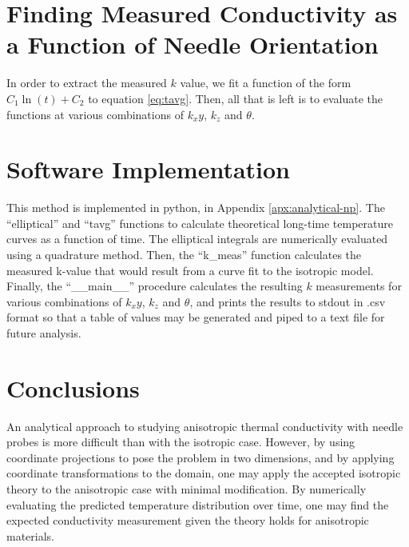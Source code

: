 \section{Finding Measured Conductivity as a Function of Needle Orientation}

In order to extract the measured \(k\) value, we fit a function of the form
\(C_1 \ln(t) + C_2\) to equation \ref{eq:tavg}. Then, all that is left is to evaluate the functions at various combinations of
\(k_xy\), \(k_z\) and \(\theta\).

\section{Software Implementation}

This method is implemented in python, in Appendix \ref{apx:analytical-np}. The ``elliptical'' and ``tavg'' functions to calculate theoretical long-time temperature curves as a function of time. The elliptical integrals are numerically evaluated using a quadrature method.  Then, the ``k\_meas'' function calculates the measured k-value that would result from a curve fit to the isotropic model. Finally, the ``\_\_main\_\_'' procedure calculates the resulting \(k\) measurements for various combinations of \(k_xy\), \(k_z\) and \(\theta\), and prints the results to stdout in .csv format so that a table of values may be generated and piped to a text file for future analysis.


\section{Conclusions}
\label{sec:analytical-np:conclusion}

An analytical approach to studying anisotropic thermal conductivity with needle
probes is more difficult than with the isotropic case. However, by using
coordinate projections to pose the problem in two dimensions, and by applying
coordinate transformations to the domain, one may apply the accepted isotropic
theory to the anisotropic case with minimal modification.  By numerically
evaluating the predicted temperature distribution over time, one may find the
expected conductivity measurement given the theory holds for anisotropic
materials.

